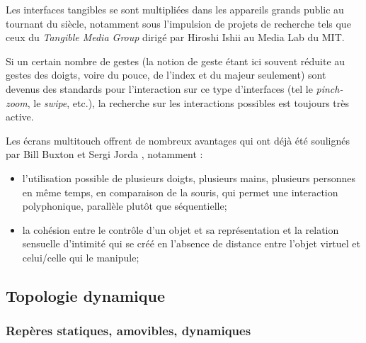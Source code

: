 Les interfaces tangibles se sont multipliées dans les appareils grands public au tournant du siècle, notamment sous l'impulsion de projets de recherche tels que ceux du \textit{Tangible Media Group} dirigé par Hiroshi Ishii au Media Lab du \gls{MIT}.

Si un certain nombre de gestes (la notion de geste étant ici souvent réduite au gestes des doigts, voire du pouce, de l'index et du majeur seulement) sont devenus des standards pour l'interaction sur ce type d'interfaces (tel le \textit{pinch-zoom}, le \textit{swipe}, etc.), la recherche sur les interactions possibles est toujours très active.

Les écrans multitouch offrent de nombreux avantages qui ont déjà été soulignés par Bill Buxton \cite{buxton_multi-touch_2007} et Sergi Jorda \cite{jorda_digital_2005}, notamment :
\vspace{-1em}
\begin{itemize}[noitemsep]
	\item l'utilisation possible de plusieurs doigts, plusieurs mains, plusieurs personnes en même temps, en comparaison de la souris, qui permet une interaction polyphonique, parallèle plutôt que séquentielle;
	\item la cohésion entre le contrôle d'un objet et sa représentation et la relation sensuelle d'intimité qui se créé en l'absence de distance entre l'objet virtuel et celui/celle qui le manipule;
\end{itemize}


\subsection{Topologie dynamique}

\subsubsection{Repères statiques, amovibles, dynamiques}

